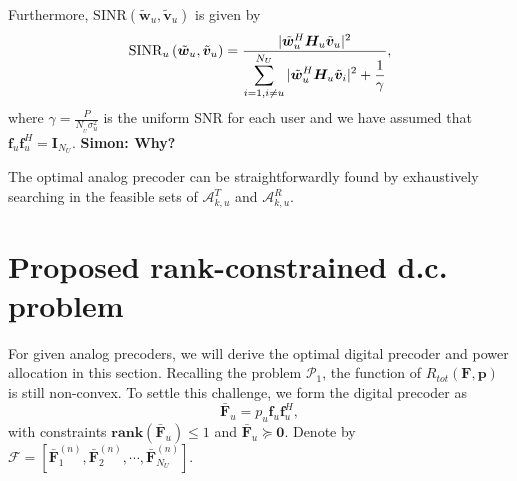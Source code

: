 \documentclass[10pt,journal,twocolumn,twoside]{IEEEtran}
\begin{document}
Furthermore, $\text{SINR}\left(\tilde{\bm w}_{u}, \tilde{\bm v}_{u}\right)$ is given by
\begin{equation}\label{SINR}
\text{SINR}_u\left(\tilde{\bm w}_{u}, \tilde{\bm v}_{u}\right) = \frac{|\tilde{\bm w}^H_{u} \bm{H}_{u} \tilde{\bm v}_{u}|^2}{\displaystyle\sum_{i=1,i\neq u}^{N_U}|\tilde{\bm w}^H_{u} \bm{H}_{u}\tilde{\bm {v}}_i|^2 + {1 \over \gamma} },
\end{equation}
where $\gamma = \frac{P}{N_{_U}\sigma_{u}^2}$ is the uniform SNR for each user and we have assumed that $\bm{f}_u\bm{f}_u^H = \bm{I}_{N_U}$. {\bf Simon: Why?}


The optimal analog precoder can be straightforwardly found by  exhaustively searching in the feasible sets of $\mathcal{A}^T_{k,u}$ and $\mathcal{A}^R_{k,u}$.



\section{Proposed rank-constrained d.c.  problem}\label{analogAndDigital}

For given analog precoders, we will derive the optimal digital precoder and power allocation in this section. Recalling the problem $\mathcal{P}_1$, the function of $R_{tot}(\bm{F}, \bm{p})$ is still non-convex.  To settle this challenge, we form the digital precoder as
\begin{equation}
\bar{\bm{F}}_{u} = p_u\bm{f}_{u} \bm{f}_{u}^H,
\end{equation}
with constraints $\textbf{rank}(\bar{\bm{F}}_{u})\leq 1$ and $\bar{\bm{F}}_{u} \succeq \bm{0}$. Denote by $\bm{\mathcal{F}} = [\bar{\bm{F}}^{(n)}_1, \bar{\bm{F}}^{(n)}_2,\cdots, \bar{\bm{F}}^{(n)}_{N_U}]$.
\end{document}

